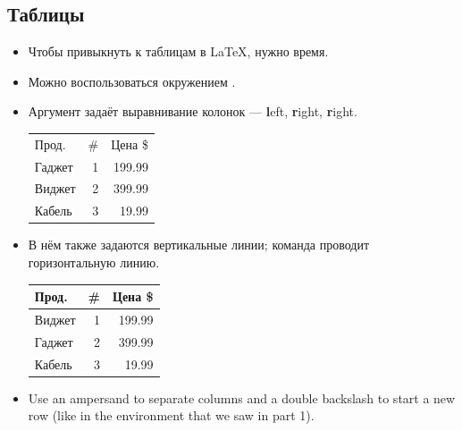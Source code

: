 \documentclass{beamer}
\begin{document}
\subsection{Таблицы}

\begin{frame}[fragile]{\insertsubsection}
\vspace{-3ex}
\begin{itemize}
\item Чтобы привыкнуть к таблицам в \LaTeX{}, нужно время.
\item Можно воспользоваться окружением .
\item Аргумент задаёт выравнивание колонок --- \textbf{l}eft, \textbf{r}ight, \textbf{r}ight.
\begin{exampletwouptiny}
\begin{tabular}{lrr}
Прод.  & \# & Цена \$ \\
Гаджет & 1  & 199.99  \\
Виджет & 2  & 399.99  \\
Кабель & 3  & 19.99   \\
\end{tabular}
\end{exampletwouptiny}
\vspace{-1ex}
\item В нём также задаются вертикальные линии; команда  проводит горизонтальную линию.
\begin{exampletwouptiny}
\begin{tabular}{|l|r|r|} \hline
Прод.  & \# & Цена \$ \\\hline
Виджет & 1  & 199.99  \\
Гаджет & 2  & 399.99  \\
Кабель & 3  & 19.99   \\\hline
\end{tabular}
\end{exampletwouptiny}
\item Use an ampersand \keystrokebftt{\&} to separate columns and a double backslash \keystrokebftt{\bs}\keystrokebftt{\bs} to start a new row (like in the  environment that we saw in part 1).
\end{itemize}
\end{frame}

\end{document}
